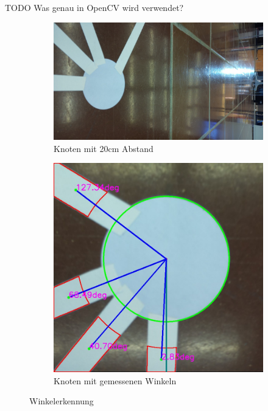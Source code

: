 TODO Was genau in OpenCV wird verwendet?

\begin{figure}[H]
\begin{subfigure}{0.55\textwidth}
\includegraphics[width=0.95\linewidth]{assets/informatik-prototyp/opencv/knoten-bild.jpeg} 
\caption{Knoten mit 20cm Abstand}
\label{fig:node-20cm-before}
\end{subfigure}
\begin{subfigure}{0.4\textwidth}
\includegraphics[width=0.95\linewidth]{assets/informatik-prototyp/opencv/knoten-winkel.jpeg} 
\caption{Knoten mit gemessenen Winkeln}
\label{fig:node-angles}
\end{subfigure}

\caption{Winkelerkennung}
\label{fig:angle-recognition}
\end{figure}

